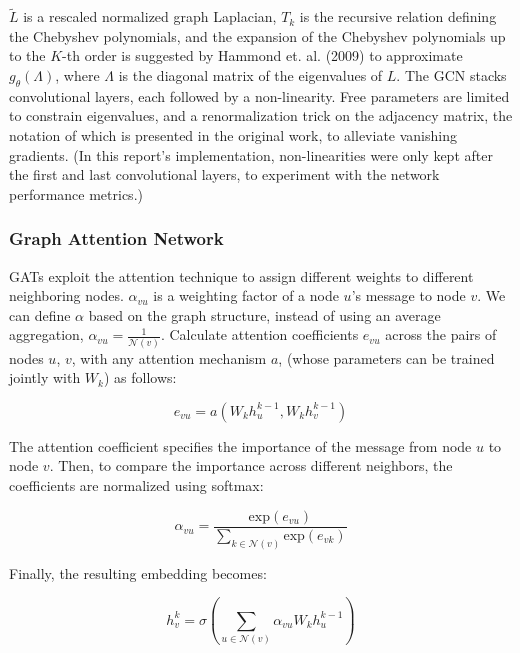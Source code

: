 \documentclass[11pt]{article}
\begin{document}
$\tilde{L}$ is a rescaled normalized graph Laplacian, $T_k$ is the recursive relation defining the Chebyshev polynomials, and the expansion of the Chebyshev polynomials up to the $K$-th order is suggested by Hammond et. al. (2009) \cite{https://doi.org/10.48550/arxiv.0912.3848} to approximate $g_\theta(\Lambda)$, where $\Lambda$ is the diagonal matrix of the eigenvalues of $L$. The GCN stacks convolutional layers, each followed by a non-linearity. Free parameters are limited to constrain eigenvalues, and a renormalization trick on the adjacency matrix, the notation of which is presented in the original work, to alleviate vanishing gradients. (In this report's implementation, non-linearities were only kept after the first and last convolutional layers, to experiment with the network performance metrics.)  

\subsubsection{Graph Attention Network}

GATs exploit the attention technique \cite{https://doi.org/10.48550/arxiv.1710.10903} to assign different weights to different neighboring nodes. $\alpha_{vu}$ is a weighting factor of a node $u$'s message to node $v$. We can define $\alpha$ based on the graph structure, instead of using an average aggregation, $\alpha_{vu}=\frac{1}{\mathcal{N}(v)}$. Calculate attention coefficients $e_{vu}$ across the pairs of nodes $u$, $v$, with any attention mechanism $a$, (whose parameters can be trained jointly with $W_k$) as follows:

\begin{equation}
    e_{vu} = a(W_kh_u^{k-1},W_kh_v^{k-1})
\end{equation}

The attention coefficient specifies the importance of the message from node $u$ to node $v$. Then, to compare the importance across different neighbors, the coefficients are normalized using softmax:

\begin{equation}
    \alpha_{vu}=\frac{\text{exp}(e_{vu})}{\sum_{k \in \mathcal{N}(v)}\text{exp}(e_{vk})}
\end{equation}

Finally, the resulting embedding becomes:

\begin{equation}
    h_v^k = \sigma \left( \sum_{u \in \mathcal{N}(v)} \alpha_{vu}W_kh_u^{k-1} \right)
\end{equation}
\end{document}

